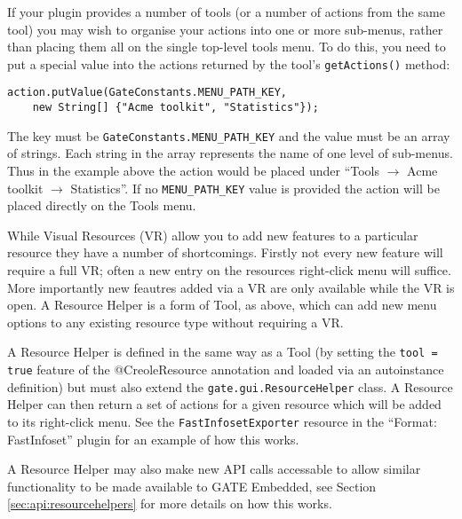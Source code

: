 If your plugin provides a number of tools (or a number of actions from the same
tool) you may wish to organise your actions into one or more sub-menus, rather
than placing them all on the single top-level tools menu.  To do this, you need
to put a special value into the actions returned by the tool's
\lstinline!getActions()! method:
\begin{lstlisting}
action.putValue(GateConstants.MENU_PATH_KEY,
    new String[] {"Acme toolkit", "Statistics"});
\end{lstlisting}
The key must be \lstinline!GateConstants.MENU_PATH_KEY! and the value must be
an array of strings.  Each string in the array represents the name of one level
of sub-menus.  Thus in the example above the action would be placed under
``Tools $\rightarrow$ Acme toolkit $\rightarrow$ Statistics''.  If no
\lstinline!MENU_PATH_KEY! value is provided the action will be placed directly
on the Tools menu.


While Visual Resources (VR) allow you to add new features to a particular
resource they have a number of shortcomings. Firstly not every new feature
will require a full VR; often a new entry on the resources right-click
menu will suffice. More importantly new feautres added via a VR are only
available while the VR is open. A Resource Helper is a form of Tool, as
above, which can add new menu options to any existing resource type without
requiring a VR.

A Resource Helper is defined in the same way as a Tool (by setting the
\verb|tool = true| feature of the @CreoleResource annotation and loaded via an
autoinstance definition) but must also extend the \verb|gate.gui.ResourceHelper|
class. A Resource Helper can then return a set of actions for a given resource
which will be added to its right-click menu. See the \verb|FastInfosetExporter|
resource in the ``Format: FastInfoset'' plugin for an example of how this works.

A Resource Helper may also make new API calls accessable to allow similar
functionality to be made available to GATE Embedded, see Section
\ref{sec:api:resourcehelpers} for more details on how this works.
